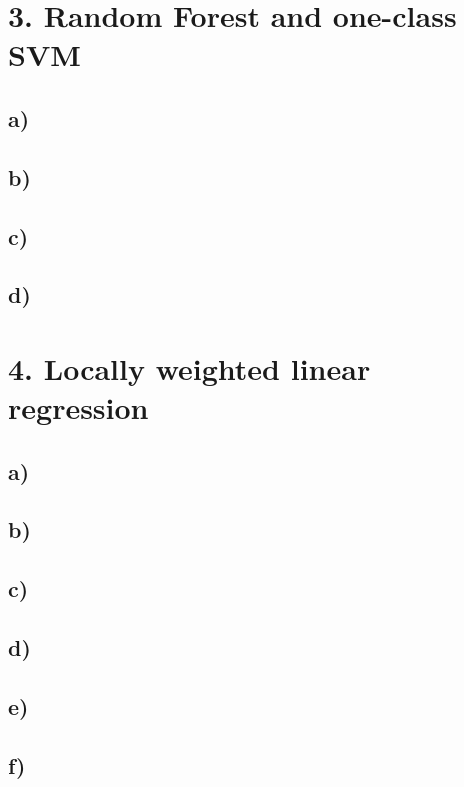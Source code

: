\documentclass[
]{article}
\begin{document}
\hypertarget{random-forest-and-one-class-svm}{%
\section{3. Random Forest and one-class
SVM}\label{random-forest-and-one-class-svm}}

\hypertarget{a-2}{%
\subsection{a)}\label{a-2}}

\hypertarget{b-2}{%
\subsection{b)}\label{b-2}}

\hypertarget{c-1}{%
\subsection{c)}\label{c-1}}

\hypertarget{d-1}{%
\subsection{d)}\label{d-1}}

\hypertarget{locally-weighted-linear-regression}{%
\section{4. Locally weighted linear
regression}\label{locally-weighted-linear-regression}}

\hypertarget{a-3}{%
\subsection{a)}\label{a-3}}

\hypertarget{b-3}{%
\subsection{b)}\label{b-3}}

\hypertarget{c-2}{%
\subsection{c)}\label{c-2}}

\hypertarget{d-2}{%
\subsection{d)}\label{d-2}}

\hypertarget{e}{%
\subsection{e)}\label{e}}

\hypertarget{f}{%
\subsection{f)}\label{f}}
\end{document}
